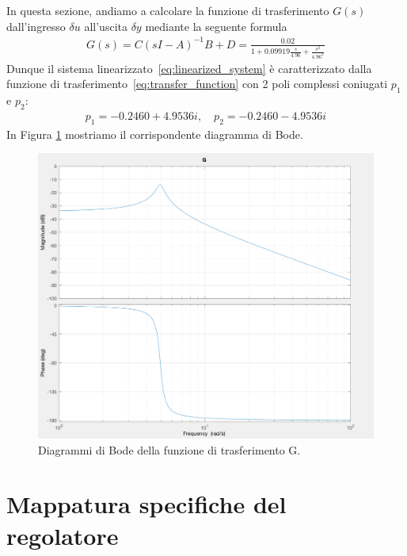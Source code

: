 \documentclass[a4paper, 11pt]{article}
\begin{document}
In questa sezione, andiamo a calcolare la funzione di trasferimento $G(s)$ dall'ingresso $\delta u$ all'uscita $\delta y$ mediante la seguente formula 
%
%
\begin{align}\label{eq:transfer_function}
G(s) = C(sI-A)^{-1}B + D = \frac{0.02}{1+0.09919\frac{s}{4.96}+\frac{s^2}{4.96^2}}
\end{align}
%
Dunque il sistema linearizzato~\eqref{eq:linearized_system} è caratterizzato dalla funzione di trasferimento~\eqref{eq:transfer_function} con 2 poli complessi coniugati $p_1$ e $p_2$:
\begin{align}
	p_1 = -0.2460 + 4.9536i, \quad p_2 = -0.2460 - 4.9536i
\end{align}
In Figura \ref{fig:G_bode} mostriamo il corrispondente diagramma di Bode. 

\begin{figure}[h!]
	\centering
	\includegraphics[width=0.75\linewidth]{./images/bode_G.png}
	\caption{Diagrammi di Bode della funzione di trasferimento G.}
	\label{fig:G_bode}
\end{figure}

\section{Mappatura specifiche del regolatore}
\label{sec:specifications}
\end{document}
